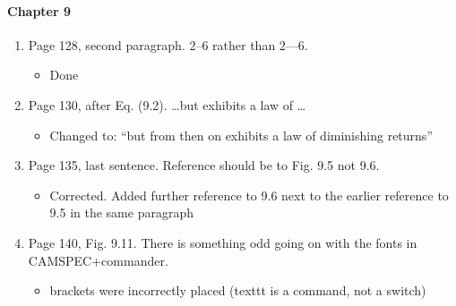 \documentclass[11pt]{article}
\begin{document}
\paragraph{Chapter 9}
\begin{enumerate}
\item Page 128, second paragraph. 2--6 rather than 2---6.
    \begin{itemize}
        \item Done
    \end{itemize}
\item Page 130, after Eq. (9.2). \ldots but exhibits a law of \ldots
    \begin{itemize}
        \item Changed to: ``but from then on exhibits a law of diminishing returns''
    \end{itemize}
\item Page 135, last sentence. Reference should be to Fig. 9.5 not
  9.6.
  \begin{itemize}
      \item Corrected. Added further reference to 9.6 next to the earlier reference to 9.5 in the same paragraph
  \end{itemize}
\item Page 140, Fig. 9.11. There is something odd going on with the
  fonts in CAMSPEC+commander.
  \begin{itemize}
      \item brackets were incorrectly placed (texttt is a command, not a switch)
  \end{itemize}
\end{enumerate}
\end{document}
